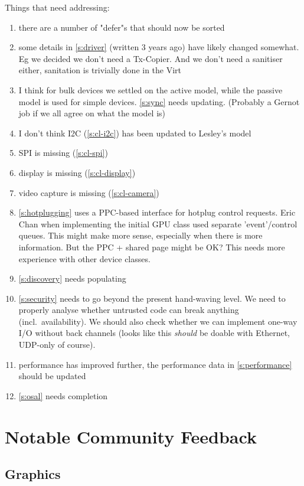 \documentclass[a4paper,12pt]{report}
\begin{document}
Things that need addressing:
\begin{enumerate}
\item there are a number of "defer"s that should now be sorted
\item some details in \autoref{s:driver} (written 3 years ago) have
  likely changed somewhat. Eg we decided we don't need a
  Tx-Copier. And we don't need a sanitiser either, sanitation is
  trivially done in the Virt
\item I think for bulk devices we settled on the active model, while
  the passive model is used for simple devices. \autoref{s:sync} needs
  updating. (Probably a Gernot job if we all agree on what the model is)
\item I don't think I2C (\autoref{s:cl-i2c}) has been updated to Lesley's model
\item SPI is missing (\autoref{s:cl-spi})
\item  display is missing (\autoref{s:cl-display})
\item  video capture is missing (\autoref{s:cl-camera})
\item \autoref{s:hotplugging} uses a PPC-based interface for hotplug control requests.
  Eric Chan when implementing the initial GPU class used separate 'event'/control queues.
  This might make more sense, especially when there is more information. But the
  PPC + shared page might be OK? This needs more experience with other device classes.
\item \autoref{s:discovery} needs populating
\item \autoref{s:security} needs to go beyond the present hand-waving
  level. We need to properly analyse whether untrusted code can break
  anything (incl.\ availability). We should also check whether we can
  implement one-way I/O without back channels (looks like this
  \emph{should} be doable with Ethernet, UDP-only of course).
\item performance has improved further, the performance data in
  \autoref{s:performance} should   be updated
\item \autoref{s:osal} needs completion
\end{enumerate}

\newcommand{\email}[1]{\href{mailto:#1}{#1}}

\chapter{Notable Community Feedback}

\section{Graphics}
\end{document}
